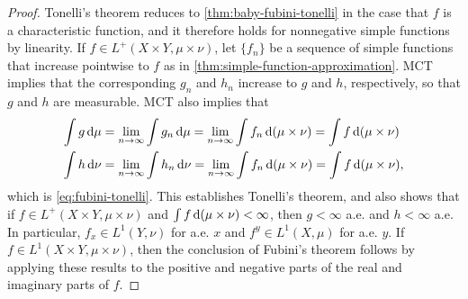 \documentclass[12pt]{article} %
\begin{document}
\begin{proof}
    Tonelli's theorem reduces to \cref{thm:baby-fubini-tonelli} in the case that $f$ is a characteristic function, and it therefore holds for nonnegative simple functions by linearity. If $f \in L^+(X \times Y, \mu \times \nu)$, let $\{f_n\}$ be a sequence of simple functions that increase pointwise to $f$ as in \cref{thm:simple-function-approximation}. MCT implies that the corresponding $g_n$ and $h_n$ increase to $g$ and $h$, respectively, so that $g$ and $h$ are measurable. MCT also implies that \begin{align*}
        \int g \, \mathrm{d} \mu &= \lim_{n \to \infty} \int g_n \, \mathrm{d} \mu = \lim_{n \to \infty} \int f_n \, \mathrm{d} (\mu \times \nu) = \int f \, \mathrm{d} (\mu \times \nu)\\
        \int h \, \mathrm{d} \nu &= \lim_{n \to \infty} \int h_n \, \mathrm{d} \nu = \lim_{n \to \infty} \int f_n \, \mathrm{d} (\mu \times \nu) = \int f \, \mathrm{d} (\mu \times \nu),
    \end{align*} which is \cref{eq:fubini-tonelli}. This establishes Tonelli's theorem, and also shows that if $f \in L^+(X \times Y, \mu \times \nu)$ and $\int f \, \mathrm{d} (\mu \times \nu) < \infty$, then $g < \infty$ a.e. and $h < \infty$ a.e. In particular, $f_x \in L^1(Y, \nu)$ for a.e. $x$ and $f^y \in L^1(X, \mu)$ for a.e. $y$. If $f \in L^1(X \times Y, \mu \times \nu)$, then the conclusion of Fubini's theorem follows by applying these results to the positive and negative parts of the real and imaginary parts of $f$.
\end{proof}
\end{document}
